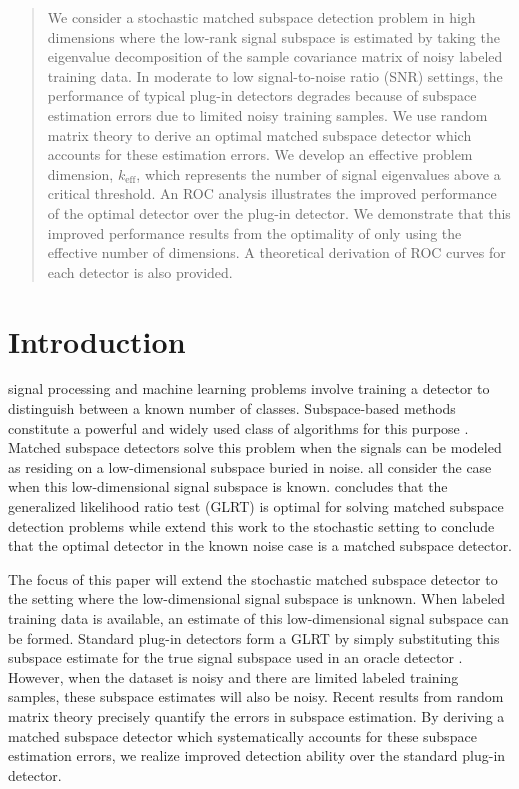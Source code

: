 \begin{abstract}
We consider a stochastic  matched subspace detection problem in high dimensions where the low-rank signal subspace is estimated by taking the eigenvalue decomposition of the sample covariance matrix of noisy labeled training data. In moderate to low signal-to-noise ratio (SNR) settings, the performance of typical plug-in detectors degrades because of subspace estimation errors due to limited noisy training samples. We use random matrix theory to derive an optimal matched subspace detector which accounts for these estimation errors. We develop an effective problem dimension, $k_{\text{eff}}$, which represents the number of signal eigenvalues above a critical threshold. An ROC analysis illustrates the improved performance of the optimal detector over the plug-in detector. We demonstrate that this improved performance results from the optimality of only using the effective number of dimensions. A theoretical derivation of ROC curves for each detector is also provided.
\end{abstract}

\section{Introduction}

 signal processing and machine learning problems involve training a detector to distinguish between a known number of classes. Subspace-based methods constitute a powerful and widely used class of algorithms for this purpose \cite{hastie2001elements,laaksonen1996subspace,scharf1994matched,jin2005cfar,mcwhorter2003matched}. Matched subspace detectors solve this problem when the signals can be modeled as residing on a low-dimensional subspace buried in noise. \cite{scharf1994matched,jin2005cfar,mcwhorter2003matched} all consider the case when this low-dimensional signal subspace is known. \cite{scharf1994matched} concludes that the generalized likelihood ratio test (GLRT) is optimal for solving matched subspace detection problems while \cite{mcwhorter2003matched} extend this work to the stochastic setting to conclude that the optimal detector in the known noise case is a matched subspace detector.

The focus of this paper will extend the stochastic matched subspace detector to the setting where the low-dimensional signal subspace is unknown. When labeled training data is available, an estimate of this low-dimensional signal subspace can be formed. Standard plug-in detectors form a GLRT by simply substituting this subspace estimate for the true signal subspace used in an oracle detector \cite{mcwhorter2003matched,jin2005cfar}. However, when the dataset is noisy and there are limited labeled training samples, these subspace estimates will also be noisy. Recent results from random matrix theory precisely quantify the errors in subspace estimation.  By deriving a matched subspace detector which systematically accounts for these subspace estimation errors, we realize improved detection ability over the standard plug-in detector.

